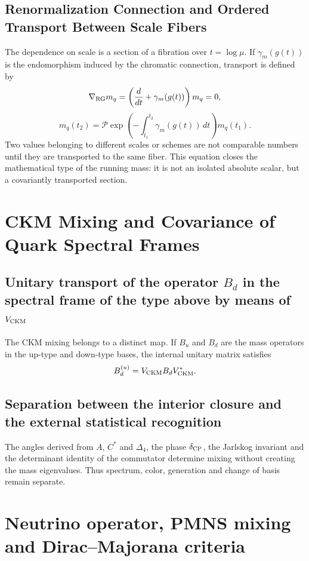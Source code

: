 \subsection{Renormalization Connection and Ordered Transport Between Scale Fibers}

The dependence on scale is a section of a fibration over
\(t=\log\mu\). If \(\gamma_m(g(t))\) is the endomorphism induced by the
chromatic connection, transport is defined by
\[
 \nabla_{\rm RG}m_q
 =\left(\frac{d}{dt}+\gamma_m(g(t))\right)m_q=0,
\]
\[
 m_q(t_2)
 =\mathcal P\exp\!\left(-\int_{t_1}^{t_2}
 \gamma_m(g(t))\,dt\right)m_q(t_1).
\]
Two values belonging to different scales or schemes are not comparable
numbers until they are transported to the same fiber. This equation closes the
mathematical type of the running mass: it is not an isolated absolute scalar, but
a covariantly transported section.

\section{CKM Mixing and Covariance of Quark Spectral Frames}

\subsection{Unitary transport of the operator \texorpdfstring{\(B_d\)}{B_d} in the spectral frame of the type above by means of \texorpdfstring{\(V_{\rm CKM}\)}{V_CKM}}

The CKM mixing belongs to a distinct map. If \(B_u\) and \(B_d\) are the
mass operators in the up-type and down-type bases, the internal unitary matrix
satisfies
\[
 B_d^{(u)}=V_{\rm CKM} B_d V_{\rm CKM}^*.
\]

\subsection{Separation between the interior closure and the external statistical recognition}

The angles derived from \(A\), \(C^*\) and \(\Delta_4\), the phase
\(\delta_{\rm CP}\), the Jarlskog invariant and the determinant identity
of the commutator determine mixing without creating the mass eigenvalues. Thus
spectrum, color, generation and change of basis remain separate.

\section{Neutrino operator, PMNS mixing and Dirac--Majorana criteria}

